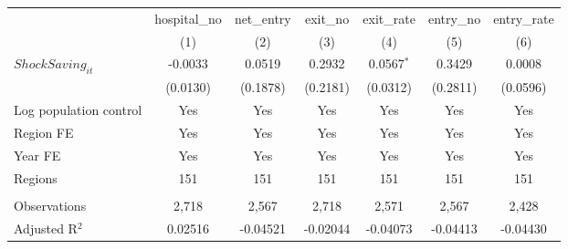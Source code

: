 \begingroup
\centering
\begin{tabular}{lcccccc}
   \toprule
                          & hospital\_no  & net\_entry  & exit\_no  & exit\_rate   & entry\_no  & entry\_rate \\    
                          & (1)           & (2)         & (3)       & (4)          & (5)        & (6)\\  
   \midrule 
   $ShockSaving_{it}$     & -0.0033       & 0.0519      & 0.2932    & 0.0567$^{*}$ & 0.3429     & 0.0008\\   
                          & (0.0130)      & (0.1878)    & (0.2181)  & (0.0312)     & (0.2811)   & (0.0596)\\   
   Log population control & Yes           & Yes         & Yes       & Yes          & Yes        & Yes\\  
   Region FE              & Yes           & Yes         & Yes       & Yes          & Yes        & Yes\\  
   Year FE                & Yes           & Yes         & Yes       & Yes          & Yes        & Yes\\  
   Regions                & 151           & 151         & 151       & 151          & 151        & 151\\  
    \\
   Observations           & 2,718         & 2,567       & 2,718     & 2,571        & 2,567      & 2,428\\  
   Adjusted R$^2$         & 0.02516       & -0.04521    & -0.02044  & -0.04073     & -0.04413   & -0.04430\\  
   \bottomrule
\end{tabular}
\par\endgroup
